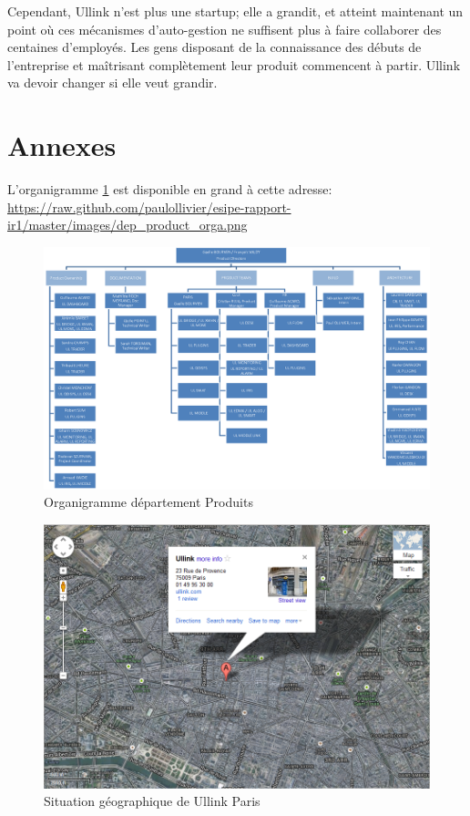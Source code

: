 \documentclass[a4paper, 12pt]{article}
\begin{document}
Cependant, Ullink n'est plus une startup; elle a grandit, et atteint maintenant un point où ces mécanismes d'auto-gestion ne suffisent plus à faire collaborer des centaines d'employés. Les gens disposant de la connaissance des débuts de l'entreprise et maîtrisant complètement leur produit commencent à partir. Ullink va devoir changer si elle veut grandir.

\pagebreak

\part*{Annexes}
L'organigramme \ref{Product_dpts_orga} est disponible en grand à cette adresse: \url{https://raw.github.com/paulollivier/esipe-rapport-ir1/master/images/dep_product_orga.png}
\begin{figure}
\includegraphics[width=525pt, angle=90]{dep_product_orga.png}
\caption{Organigramme département Produits}
\label{Product_dpts_orga}
\end{figure}

\begin{figure}
\includegraphics[width=\textwidth]{ullink_loc.png}
\caption{Situation géographique de Ullink Paris}
\label{ullink_loc}
\end{figure}
\end{document}
